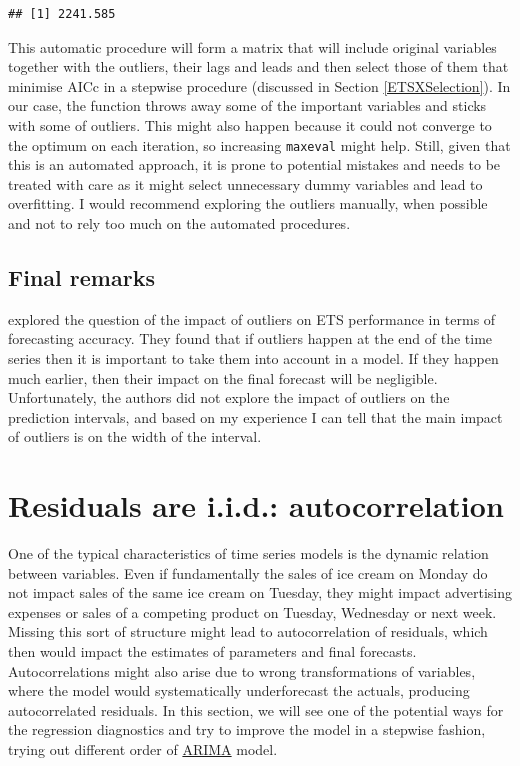 \documentclass[
]{book}
\theoremstyle{definition}
\theoremstyle{definition}
\theoremstyle{definition}
\theoremstyle{definition}
\theoremstyle{remark}
\begin{document}
\begin{verbatim}
## [1] 2241.585
\end{verbatim}

This automatic procedure will form a matrix that will include original variables together with the outliers, their lags and leads and then select those of them that minimise AICc in a stepwise procedure (discussed in Section \ref{ETSXSelection}). In our case, the function throws away some of the important variables and sticks with some of outliers. This might also happen because it could not converge to the optimum on each iteration, so increasing \texttt{maxeval} might help. Still, given that this is an automated approach, it is prone to potential mistakes and needs to be treated with care as it might select unnecessary dummy variables and lead to overfitting. I would recommend exploring the outliers manually, when possible and not to rely too much on the automated procedures.

\hypertarget{final-remarks}{%
\subsection{Final remarks}\label{final-remarks}}

\citet{Koehler2012} explored the question of the impact of outliers on ETS performance in terms of forecasting accuracy. They found that if outliers happen at the end of the time series then it is important to take them into account in a model. If they happen much earlier, then their impact on the final forecast will be negligible. Unfortunately, the authors did not explore the impact of outliers on the prediction intervals, and based on my experience I can tell that the main impact of outliers is on the width of the interval.

\hypertarget{diagnosticsResidualsIIDAuto}{%
\section{Residuals are i.i.d.: autocorrelation}\label{diagnosticsResidualsIIDAuto}}

One of the typical characteristics of time series models is the dynamic relation between variables. Even if fundamentally the sales of ice cream on Monday do not impact sales of the same ice cream on Tuesday, they might impact advertising expenses or sales of a competing product on Tuesday, Wednesday or next week. Missing this sort of structure might lead to autocorrelation of residuals, which then would impact the estimates of parameters and final forecasts. Autocorrelations might also arise due to wrong transformations of variables, where the model would systematically underforecast the actuals, producing autocorrelated residuals. In this section, we will see one of the potential ways for the regression diagnostics and try to improve the model in a stepwise fashion, trying out different order of \protect\hyperlink{ADAMARIMA}{ARIMA} model.
\end{document}
